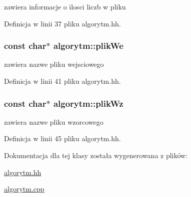 zawiera informacje o ilosci liczb w pliku 



\-Definicja w linii 37 pliku algorytm.\-hh.

\hypertarget{classalgorytm_ab911ca0437df967d0240651855e5a2a3}{
\subsubsection[{plik\-We}]{\setlength{\rightskip}{0pt plus 5cm}const char$\ast$ {\bf algorytm\-::plik\-We}}}\label{classalgorytm_ab911ca0437df967d0240651855e5a2a3}


zawiera nazwe pliku wejsciowego 



\-Definicja w linii 41 pliku algorytm.\-hh.

\hypertarget{classalgorytm_a19c2be15efb3e5e34bf177d50b746d93}{
\subsubsection[{plik\-Wz}]{\setlength{\rightskip}{0pt plus 5cm}const char$\ast$ {\bf algorytm\-::plik\-Wz}}}\label{classalgorytm_a19c2be15efb3e5e34bf177d50b746d93}


zawiera nazwe pliku wzorcowego 



\-Definicja w linii 45 pliku algorytm.\-hh.



\-Dokumentacja dla tej klasy została wygenerowana z plików\-:\begin{DoxyCompactItemize}
\item 
\hyperlink{algorytm_8hh}{algorytm.\-hh}\item 
\hyperlink{algorytm_8cpp}{algorytm.\-cpp}\end{DoxyCompactItemize}
